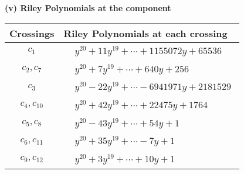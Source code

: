 \documentclass[1p]{elsarticle_modified}
\theoremstyle{definition}
\begin{document}
\flushleft \textbf{(v) Riley Polynomials at the component}\newline \\
\begin{tabular}{m{50pt}|m{274pt}}
Crossings & \hspace{64pt}Riley Polynomials at each crossing \\
\hline $$\begin{aligned}c_{1}\end{aligned}$$&$\begin{aligned}
&y^{20}+11 y^{19}+\cdots+1155072 y+65536
\end{aligned}$\\
\hline $$\begin{aligned}c_{2},c_{7}\end{aligned}$$&$\begin{aligned}
&y^{20}+7 y^{19}+\cdots+640 y+256
\end{aligned}$\\
\hline $$\begin{aligned}c_{3}\end{aligned}$$&$\begin{aligned}
&y^{20}-22 y^{19}+\cdots-6941971 y+2181529
\end{aligned}$\\
\hline $$\begin{aligned}c_{4},c_{10}\end{aligned}$$&$\begin{aligned}
&y^{20}+42 y^{19}+\cdots+22475 y+1764
\end{aligned}$\\
\hline $$\begin{aligned}c_{5},c_{8}\end{aligned}$$&$\begin{aligned}
&y^{20}-43 y^{19}+\cdots+54 y+1
\end{aligned}$\\
\hline $$\begin{aligned}c_{6},c_{11}\end{aligned}$$&$\begin{aligned}
&y^{20}+35 y^{19}+\cdots-7 y+1
\end{aligned}$\\
\hline $$\begin{aligned}c_{9},c_{12}\end{aligned}$$&$\begin{aligned}
&y^{20}+3 y^{19}+\cdots+10 y+1
\end{aligned}$\\
\hline
\end{tabular}\\~\\
\end{document}
